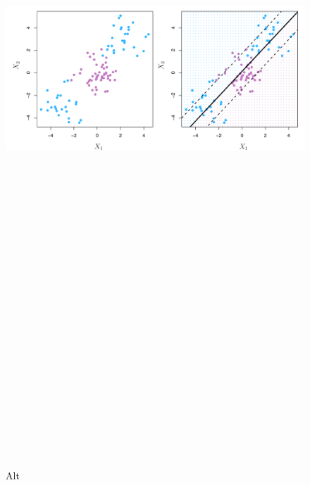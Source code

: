 \documentclass[
]{article}
\begin{document}
\begin{figure}
\centering
\includegraphics[width=1\textwidth,height=12.5in]{9.8.pdf}
\caption{Alt}
\end{figure}
\end{document}
